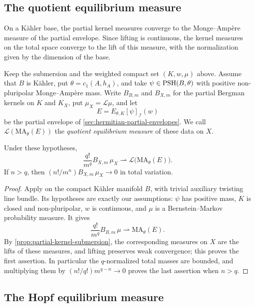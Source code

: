 \subsection{The quotient equilibrium measure}
\label{sec:partial-base-equilibrium}

On a K\"ahler base, the partial kernel measures converge to the Monge--Amp\`ere measure of the partial envelope. Since lifting is continuous, the kernel measures on the total space converge to the lift of this measure, with the normalization given by the dimension of the base.

Keep the submersion and the weighted compact set $(K,w,\mu)$ above. Assume that $B$ is K\"ahler, put $\theta=c_1(A,h_A)$, and take $\psi\in\mathrm{PSH}(B,\theta)$ with positive non-pluripolar Monge--Amp\`ere mass. Write $B_{B,m}$ and $B_{X,m}$ for the partial Bergman kernels on $K$ and $K_X$, put $\mu_X=\mathcal L\mu$, and let
\[
 E=E_{\theta,K}[\psi]_{\mathcal I}(w)
\]
be the partial envelope of \cref{sec:hermitian-partial-envelopes}. We call $\mathcal L(\mathrm{MA}_\theta(E))$ the \emph{quotient equilibrium measure} of these data on $X$.

\begin{theorem}\label{thm:partial-kernel-quotient-limit}
Under these hypotheses,
\[
 \frac{q!}{m^q}B_{X,m}\,\mu_X
       \rightharpoonup\mathcal L\bigl(\mathrm{MA}_\theta(E)\bigr).
\]
If $n>q$, then $(n!/m^n)B_{X,m}\,\mu_X\to0$ in total variation.
\end{theorem}
\begin{proof}
Apply \cite[Theorem~14.3.1]{SGPT} on the compact K\"ahler manifold $B$, with trivial auxiliary twisting line bundle. Its hypotheses are exactly our assumptions: $\psi$ has positive mass, $K$ is closed and non-pluripolar, $w$ is continuous, and $\mu$ is a Bernstein--Markov probability measure. It gives
\[
 \frac{q!}{m^q}B_{B,m}\,\mu
          \rightharpoonup\mathrm{MA}_\theta(E).
\]
By \cref{prop:partial-kernel-submersion}, the corresponding measures on $X$ are the lifts of these measures, and lifting preserves weak convergence; this proves the first assertion. In particular the $q$-normalized total masses are bounded, and multiplying them by $(n!/q!)m^{q-n}\to0$ proves the last assertion when $n>q$.
\end{proof}

\subsection{The Hopf equilibrium measure}
\label{sec:partial-hopf-equilibrium}

